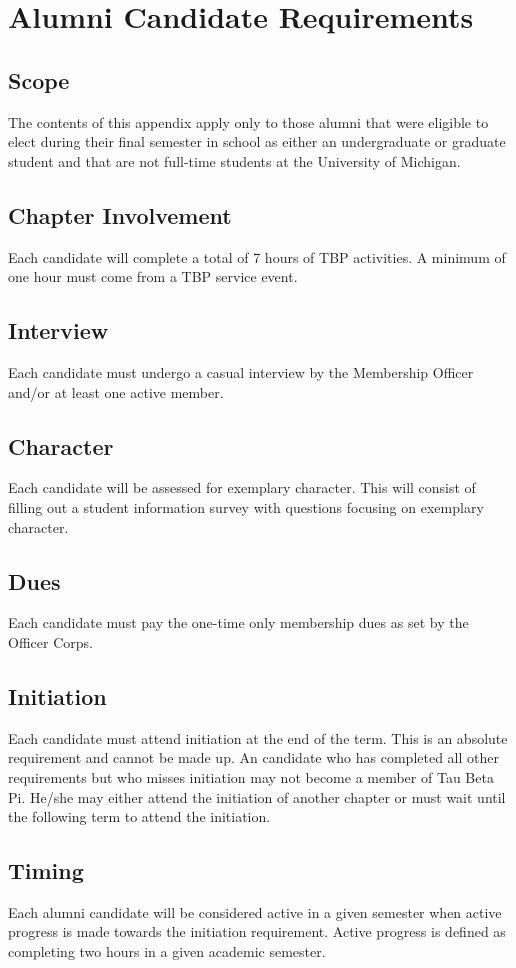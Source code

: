\chapter{Alumni Candidate Requirements}\label{sec:alumnireqs}%
\section{Scope} The contents of this appendix apply only to those alumni that were eligible to elect during their final semester in school as either an undergraduate or graduate student and that are not full-time students at the  University of Michigan.
\section{Chapter Involvement} Each candidate will complete a total of 7 hours of TBP activities. A minimum of one hour must come from a TBP service event.
\section{Interview} Each candidate must undergo a casual interview by the Membership Officer and/or at least one active member. 
\section{Character} Each candidate will be assessed for exemplary character. This will consist of filling out a student information survey with questions focusing on exemplary character.
\section{Dues} Each candidate must pay the one-time only membership dues as set by the Officer Corps. 
\section{Initiation} Each candidate must attend initiation at the end of the term. This is an absolute requirement and cannot be made up. An candidate who has completed all other requirements but who misses initiation may not become a member of Tau Beta Pi. He/she may either attend the initiation of another chapter or must wait until the following term to attend the initiation.  
\section{Timing} Each alumni candidate will be considered active in a given semester when active progress is made towards the initiation requirement. Active progress is defined as completing two hours in a given academic semester.
